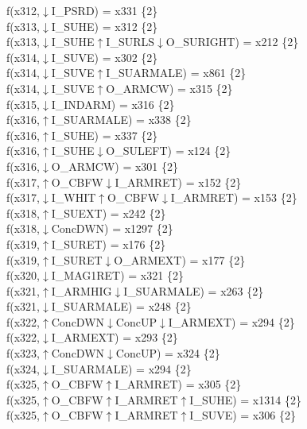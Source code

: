 f(x312,$\downarrow$I\_PSRD) = x331 \{2\} \\  
f(x313,$\downarrow$I\_SUHE) = x312 \{2\} \\  
f(x313,$\downarrow$I\_SUHE$\uparrow$I\_SURLS$\downarrow$O\_SURIGHT) = x212 \{2\} \\  
f(x314,$\downarrow$I\_SUVE) = x302 \{2\} \\  
f(x314,$\downarrow$I\_SUVE$\uparrow$I\_SUARMALE) = x861 \{2\} \\  
f(x314,$\downarrow$I\_SUVE$\uparrow$O\_ARMCW) = x315 \{2\} \\  
f(x315,$\downarrow$I\_INDARM) = x316 \{2\} \\  
f(x316,$\uparrow$I\_SUARMALE) = x338 \{2\} \\  
f(x316,$\uparrow$I\_SUHE) = x337 \{2\} \\  
f(x316,$\uparrow$I\_SUHE$\downarrow$O\_SULEFT) = x124 \{2\} \\  
f(x316,$\downarrow$O\_ARMCW) = x301 \{2\} \\  
f(x317,$\uparrow$O\_CBFW$\downarrow$I\_ARMRET) = x152 \{2\} \\  
f(x317,$\downarrow$I\_WHIT$\uparrow$O\_CBFW$\downarrow$I\_ARMRET) = x153 \{2\} \\  
f(x318,$\uparrow$I\_SUEXT) = x242 \{2\} \\  
f(x318,$\downarrow$ConcDWN) = x1297 \{2\} \\  
f(x319,$\uparrow$I\_SURET) = x176 \{2\} \\  
f(x319,$\uparrow$I\_SURET$\downarrow$O\_ARMEXT) = x177 \{2\} \\  
f(x320,$\downarrow$I\_MAG1RET) = x321 \{2\} \\  
f(x321,$\uparrow$I\_ARMHIG$\downarrow$I\_SUARMALE) = x263 \{2\} \\  
f(x321,$\downarrow$I\_SUARMALE) = x248 \{2\} \\  
f(x322,$\uparrow$ConcDWN$\downarrow$ConcUP$\downarrow$I\_ARMEXT) = x294 \{2\} \\  
f(x322,$\downarrow$I\_ARMEXT) = x293 \{2\} \\  
f(x323,$\uparrow$ConcDWN$\downarrow$ConcUP) = x324 \{2\} \\  
f(x324,$\downarrow$I\_SUARMALE) = x294 \{2\} \\  
f(x325,$\uparrow$O\_CBFW$\uparrow$I\_ARMRET) = x305 \{2\} \\  
f(x325,$\uparrow$O\_CBFW$\uparrow$I\_ARMRET$\uparrow$I\_SUHE) = x1314 \{2\} \\  
f(x325,$\uparrow$O\_CBFW$\uparrow$I\_ARMRET$\uparrow$I\_SUVE) = x306 \{2\} \\  
